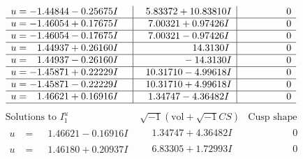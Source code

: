 \documentclass[1p]{elsarticle_modified}
\theoremstyle{definition}
\newcommand{\I}{\sqrt{-1}}
\begin{document}
$$\begin{array}{c|c|c}
\begin{aligned}
u &= -1.44844 - 0.25675 I\end{aligned}
 & \phantom{-}5.83372 + 10.83810 I & \phantom{-0.000000 } 0 \\ \hline\begin{aligned}
u &= -1.46054 + 0.17675 I\end{aligned}
 & \phantom{-}7.00321 + 0.97426 I & \phantom{-0.000000 } 0 \\ \hline\begin{aligned}
u &= -1.46054 - 0.17675 I\end{aligned}
 & \phantom{-}7.00321 - 0.97426 I & \phantom{-0.000000 } 0 \\ \hline\begin{aligned}
u &= \phantom{-}1.44937 + 0.26160 I\end{aligned}
 & \phantom{-0.000000 -}14.3130 I & \phantom{-0.000000 } 0 \\ \hline\begin{aligned}
u &= \phantom{-}1.44937 - 0.26160 I\end{aligned}
 & \phantom{-0.000000 } -14.3130 I & \phantom{-0.000000 } 0 \\ \hline\begin{aligned}
u &= -1.45871 + 0.22229 I\end{aligned}
 & \phantom{-}10.31710 - 4.99618 I & \phantom{-0.000000 } 0 \\ \hline\begin{aligned}
u &= -1.45871 - 0.22229 I\end{aligned}
 & \phantom{-}10.31710 + 4.99618 I & \phantom{-0.000000 } 0 \\ \hline\begin{aligned}
u &= \phantom{-}1.46621 + 0.16916 I\end{aligned}
 & \phantom{-}1.34747 - 4.36482 I & \phantom{-0.000000 } 0\\
 \hline 
 \end{array}$$\newpage$$\begin{array}{c|c|c}  
\text{Solutions to }I^u_{1}& \I (\text{vol} + \sqrt{-1}CS) & \text{Cusp shape}\\
 \hline 
\begin{aligned}
u &= \phantom{-}1.46621 - 0.16916 I\end{aligned}
 & \phantom{-}1.34747 + 4.36482 I & \phantom{-0.000000 } 0 \\ \hline\begin{aligned}
u &= \phantom{-}1.46180 + 0.20937 I\end{aligned}
 & \phantom{-}6.83305 + 1.72993 I & \phantom{-0.000000 } 0 \\ \hline\begin{aligned}

\end{aligned}
\end{array}$$
\end{document}
